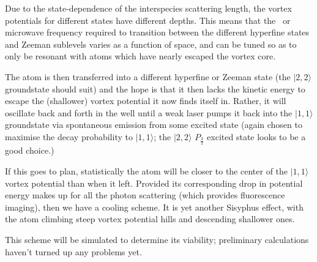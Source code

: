 Due to the state-dependence of the interspecies scattering length, the vortex potentials for different states have different depths. This means that the \rf\ or microwave frequency required to transition between the different hyperfine states and Zeeman sublevels varies as a function of space, and can be tuned so as to only be resonant with atoms which have nearly escaped the vortex core.

The atom is then transferred into a different hyperfine or Zeeman state (the $|2,2\rangle$ groundstate should suit) and the hope is that it then lacks the kinetic energy to escape the (shallower) vortex potential it now finds itself in. Rather, it will oscillate back and forth in the well until a weak laser pumps it back into the $|1,1\rangle$ groundstate via spontaneous emission from some excited state (again chosen to maximise the decay probability to $|1,1\rangle$; the $|2,2\rangle$ $P_\frac32$ excited state looks to be a good choice.)

If this goes to plan, statistically the atom will be closer to the center of the  $|1,1\rangle$ vortex potential than when it left. Provided its corresponding drop in potential energy makes up for all the photon scattering (which provides fluorescence imaging), then we have a cooling scheme. It is yet another Sisyphus effect, with the atom climbing steep vortex potential hills and descending shallower ones.

This scheme will be simulated to determine its viability; preliminary calculations haven't turned up any problems yet.
